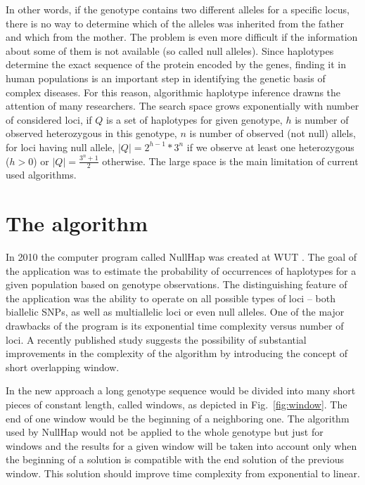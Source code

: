 \documentclass[]{spie}
\begin{document}
In other words, if the genotype contains two different alleles for a specific locus, there is no way to determine which of the alleles was inherited from the father and which from the mother.
The problem is even more difficult if the information about some of them is not available (so called null alleles).
Since haplotypes determine the exact sequence of the protein encoded by the genes, finding it in human populations is an important step in identifying the genetic basis of complex diseases.
For this reason, algorithmic haplotype inference drawns the attention of many researchers.
The search space grows exponentially with number of considered loci,
if $Q$ is a set of haplotypes for given genotype, $h$ is number of observed heterozygous in this genotype, $n$ is number of observed (not null) allels,
for loci having null allele,
$|Q| = 2^{h - 1}*3^{n}$ if we observe at least one heterozygous ($h > 0$) or $|Q|=\frac{3^{n}+1}{2}$ otherwise.
The large space is the main limitation of current used algorithms.

\section{The algorithm}

In 2010 the computer program called NullHap was created at WUT \cite{nowak}.
The goal of the application was to estimate the probability of occurrences of haplotypes for a given population based on genotype observations.
The distinguishing feature of the application was the ability to operate on all possible types of loci -- both biallelic SNPs, as well as multiallelic loci or even null alleles.
One of the major drawbacks of the program is its exponential time complexity versus number of loci.
A recently published study \cite{gusev} suggests the possibility of substantial improvements in the complexity of the algorithm by introducing the concept of short overlapping window.

In the new approach a long genotype sequence would be divided into many short pieces of constant length, called windows, as depicted in Fig.~\ref{fig:window}.
The end of one window would be the beginning of a neighboring one.
The algorithm used by NullHap would not be applied to the whole genotype but just for windows and the results for a given window will be taken into account only when the beginning of a solution is compatible with the end solution of the previous window.
This solution should improve time complexity from exponential to linear.
\end{document}
